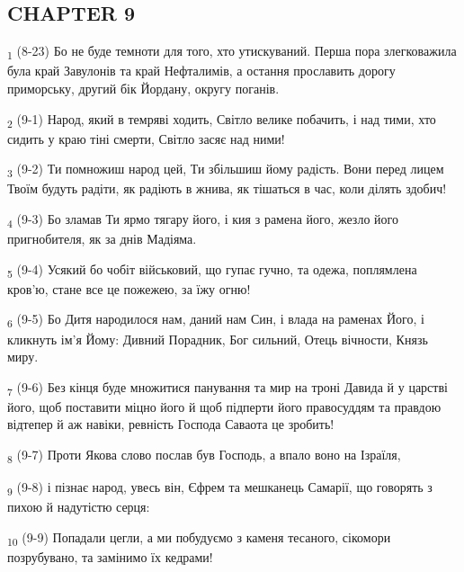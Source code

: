 \subsection{CHAPTER 9}
\begin{tcolorbox}
\textsubscript{1} (8-23) Бо не буде темноти для того, хто утискуваний. Перша пора злегковажила була край Завулонів та край Нефталимів, а остання прославить дорогу приморську, другий бік Йордану, округу поганів.
\end{tcolorbox}
\begin{tcolorbox}
\textsubscript{2} (9-1) Народ, який в темряві ходить, Світло велике побачить, і над тими, хто сидить у краю тіні смерти, Світло засяє над ними!
\end{tcolorbox}
\begin{tcolorbox}
\textsubscript{3} (9-2) Ти помножиш народ цей, Ти збільшиш йому радість. Вони перед лицем Твоїм будуть радіти, як радіють в жнива, як тішаться в час, коли ділять здобич!
\end{tcolorbox}
\begin{tcolorbox}
\textsubscript{4} (9-3) Бо зламав Ти ярмо тягару його, і кия з рамена його, жезло його пригнобителя, як за днів Мадіяма.
\end{tcolorbox}
\begin{tcolorbox}
\textsubscript{5} (9-4) Усякий бо чобіт військовий, що гупає гучно, та одежа, поплямлена кров'ю, стане все це пожежею, за їжу огню!
\end{tcolorbox}
\begin{tcolorbox}
\textsubscript{6} (9-5) Бо Дитя народилося нам, даний нам Син, і влада на раменах Його, і кликнуть ім'я Йому: Дивний Порадник, Бог сильний, Отець вічности, Князь миру.
\end{tcolorbox}
\begin{tcolorbox}
\textsubscript{7} (9-6) Без кінця буде множитися панування та мир на троні Давида й у царстві його, щоб поставити міцно його й щоб підперти його правосуддям та правдою відтепер й аж навіки, ревність Господа Саваота це зробить!
\end{tcolorbox}
\begin{tcolorbox}
\textsubscript{8} (9-7) Проти Якова слово послав був Господь, а впало воно на Ізраїля,
\end{tcolorbox}
\begin{tcolorbox}
\textsubscript{9} (9-8) і пізнає народ, увесь він, Єфрем та мешканець Самарії, що говорять з пихою й надутістю серця:
\end{tcolorbox}
\begin{tcolorbox}
\textsubscript{10} (9-9) Попадали цегли, а ми побудуємо з каменя тесаного, сікомори позрубувано, та замінимо їх кедрами!
\end{tcolorbox}
